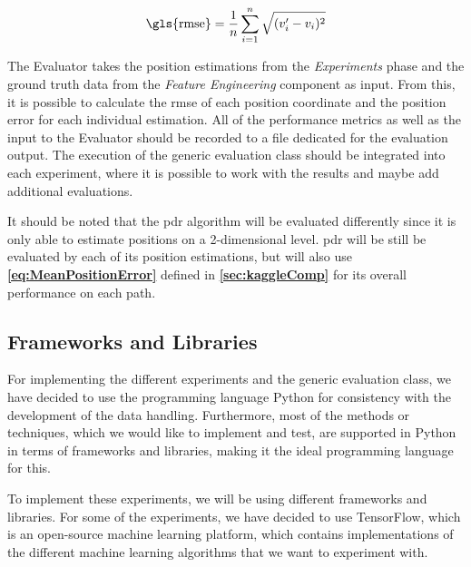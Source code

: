 \begin{equation}
    \text{\gls{rmse}} = \frac{1}{n} \sum_{i = 1}^{n} \sqrt{(v_{i}' - v_i)^2}
    \label{eq:rmse}
\end{equation}

The Evaluator takes the position estimations from the \textit{Experiments} phase and the ground truth data from the \textit{Feature Engineering} component as input. From this, it is possible to calculate the \gls{rmse} of each position coordinate and the position error for each individual estimation. All of the performance metrics as well as the input to the Evaluator should be recorded to a file dedicated for the evaluation output. The execution of the generic evaluation class should be integrated into each experiment, where it is possible to work with the results and maybe add additional evaluations.

It should be noted that the \gls{pdr} algorithm will be evaluated differently since it is only able to estimate positions on a 2-dimensional level. \gls{pdr} will be still be evaluated by each of its position estimations, but will also use \textbf{\autoref{eq:MeanPositionError}} defined in \textbf{\autoref{sec:kaggleComp}} for its overall performance on each path.


\subsection{Frameworks and Libraries}
For implementing the different experiments and the generic evaluation class, we have decided to use the programming language Python for consistency with the development of the data handling. Furthermore, most of the methods or techniques, which we would like to implement and test, are supported in Python in terms of frameworks and libraries, making it the ideal programming language for this.

To implement these experiments, we will be using different frameworks and libraries. For some of the experiments, we have decided to use TensorFlow, which is an open-source machine learning platform, which contains implementations of the different machine learning algorithms that we want to experiment with. \cite{TensorFlow}

